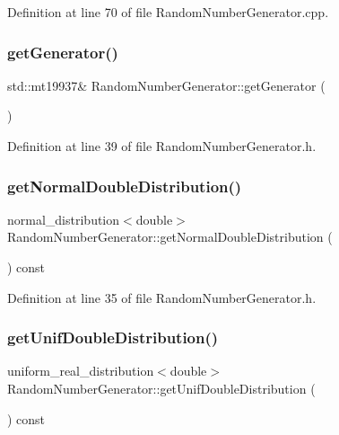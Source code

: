 Definition at line 70 of file Random\+Number\+Generator.\+cpp.

\mbox{\label{class_random_number_generator_ad6b1e6df06f9f581e67ab803567e8617}} 
\subsubsection{getGenerator()}
{\footnotesize\ttfamily std\+::mt19937\& Random\+Number\+Generator\+::get\+Generator (\begin{DoxyParamCaption}{ }\end{DoxyParamCaption})\hspace{0.3cm}{\ttfamily [inline]}}



Definition at line 39 of file Random\+Number\+Generator.\+h.

\mbox{\label{class_random_number_generator_a00c87143dea0833fc03370c09b1c4578}} 
\subsubsection{getNormalDoubleDistribution()}
{\footnotesize\ttfamily normal\+\_\+distribution$<$double$>$ Random\+Number\+Generator\+::get\+Normal\+Double\+Distribution (\begin{DoxyParamCaption}{ }\end{DoxyParamCaption}) const\hspace{0.3cm}{\ttfamily [inline]}}



Definition at line 35 of file Random\+Number\+Generator.\+h.

\mbox{\label{class_random_number_generator_aff9f8880d7a793787a500ad7aa8ac453}} 
\subsubsection{getUnifDoubleDistribution()}
{\footnotesize\ttfamily uniform\+\_\+real\+\_\+distribution$<$double$>$ Random\+Number\+Generator\+::get\+Unif\+Double\+Distribution (\begin{DoxyParamCaption}{ }\end{DoxyParamCaption}) const\hspace{0.3cm}{\ttfamily [inline]}}



